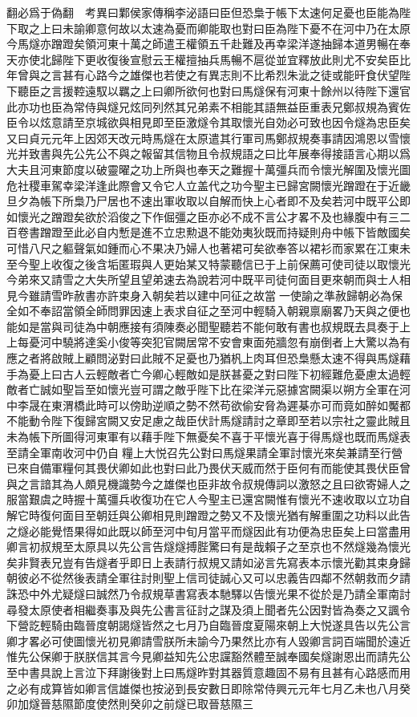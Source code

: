 翻必爲于偽翻　考異曰鄴侯家傳稱李泌語曰臣但恐梟于帳下太速何足憂也臣能為陛下取之上曰未諭卿意何故以太速為憂而卿能取也對曰臣為陛下憂不在河中乃在太原今馬燧亦蹭蹬矣領河東十萬之師遣王權領五千赴難及再幸梁洋遂抽歸本道男暢在奉天亦使北歸陛下更收復後宣慰云王權擅抽兵馬暢不扈從並宜釋放此則尤不安矣臣比年曾與之言甚有心路今之雄傑也若使之有異志則不比希烈朱泚之徒或能旰食伏望陛下聽臣之言援鞚遠馭以羈之上曰卿所欲何也對曰馬燧保有河東十餘州以待陛下還官此亦功也臣為常侍與燧兄炫同列然其兄弟素不相能其語無益臣重表兄鄭叔規為賓佐臣令以炫意請至京城欲與相見即至臣激燧令其取懷光自効必可致也因令燧為忠臣矣又曰貞元元年上因郊天改元時馬燧在太原遣其行軍司馬鄭叔規奏事請因鴻恩以雪懷光并致書與先公先公不與之報留其信物且令叔規語之曰比年展奉得接語言心期以爲大夫且河東節度以破靈曜之功上所與也奉天之難握十萬彊兵而令懷光解圍及懷光圖危社稷車駕幸梁洋逢此際會又令它人立盖代之功今聖主已歸宮闕懷光蹭蹬在于近畿旦夕為帳下所梟乃尸居也不速出軍收取以自解而快上心者即不及矣若河中既平公即如懷光之蹭蹬矣欲於滔俊之下作倔彊之臣亦必不成不言公才畧不及也緣腹中有三二百卷書蹭蹬至此必自内慙是進不立忠勲退不能効夷狄既而持疑則舟中帳下皆敵國矣可惜八尺之軀聲氣如鍾而心不果决乃婦人也著裙可矣欲奉答以裙衫而家累在冮東未至今聖上收復之後含垢匿瑕與人更始某又特蒙聽信已于上前保薦可使司徒以取懷光今弟來又請雪之大失所望且望弟速去為說若河中既平司徒何面目更來朝而與士人相見今雖請雪昨赦書亦許束身入朝矣若以建中冋征之故當一使諭之準赦歸朝必為保全如不奉詔當領全師問罪因速上表求自征之至河中輕騎入朝親禀廟畧乃天與之便也能如是當與司徒為中朝應接有須陳奏必聞聖聽若不能何敢有書也叔規既去具奏于上上每憂河中驍將達奚小俊等突犯官闕居常不安會東面苑牆忽有崩倒者上大驚以為有應之者將啟賊上顧問泌對曰此賊不足憂也乃猶杋上肉耳但恐梟懸太速不得與馬燧藉手為憂上曰古人云輕敵者亡今卿心輕敵如是朕甚憂之對曰陛下初經難危憂慮太過輕敵者亡誠如聖旨至如懷光豈可謂之敵乎陛下比在梁洋元惡據宮闕渠以朔方全軍在河中李晟在東渭橋此時可以傍助逆順之勢不然苟欲偷安脅為遲棊亦可而竟如醉如魘都不能動令陛下復歸宮闕又安足慮之哉臣伏計馬燧請討之章即至若以宗社之靈此賊且未為帳下所圖得河東軍有以藉手陛下無憂矣不喜于平懷光喜于得馬燧也既而馬燧表至請全軍南收河中仍自糧上大悦召先公對曰馬燧果請全軍討懷光來矣兼請至行營已來自備軍糧何其畏伏卿如此也對曰此乃畏伏天威而然于臣何有而能使其畏伏臣曾與之言諳其為人頗見機識勢今之雄傑也臣非故令叔規傳詞以激怒之且曰欲寄婦人之服當艱虞之時握十萬彊兵收復功在它人今聖主已還宮闕惟有懷光不速收取以立功自解它時復何面目至朝廷與公卿相見則蹭蹬之勢又不及懷光猶有解重圍之功料以此告之燧必能覺悟果得如此既以師至河中旬月當平而燧因此有功便為忠臣矣上曰當盡用卿言初叔規至太原具以先公言告燧燧搏䏶驚曰有是哉賴子之至京也不然燧幾為懷光矣非賢表兄豈有告燧者乎即日上表請行叔規又請如泌言先寫表本示懷光勸其束身歸朝彼必不從然後表請全軍往討則聖上信司徒誠心又可以忠義告四鄰不然朝救而夕請誅恐中外尤疑燧曰誠然乃令叔規草書寫表本馳驛以告懷光果不從於是乃請全軍南討尋發太原使者相繼奏事及與先公書言征討之謀及須上聞者先公因對皆為奏之又諷令下營訖輕騎由臨晉度朝謁燧皆然之七月乃自臨晉度夏陽來朝上大悦遂具告以先公言卿才畧必可使圖懷光初見卿請雪朕所未諭今乃果然比亦有人毀卿言詞百端聞於遠近惟先公保卿于朕朕信其言今見卿益知先公忠讜豁然體至誠奉國矣燧謝恩出而請先公至中書具說上言泣下拜謝後對上曰馬燧昨對其器質意趣固不易有且甚有心路感而用之必有成算皆如卿言信雄傑也按泌到長安數日即除常侍興元元年七月乙未也八月癸卯加燧晉慈隰節度使然則癸卯之前燧已取晉慈隰三